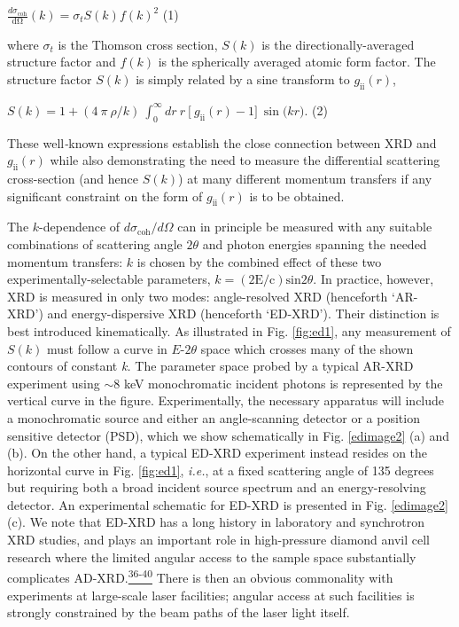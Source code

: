 \(\frac{d\sigma_{\text{coh}}}{\text{dΩ}}\left( k \right) = \sigma_{t}S\left( k \right){f\left( k \right)}^{2}\)
(1)

where \(\sigma_{t}\) is the Thomson cross section, \(S(k)\) is the
directionally-averaged structure factor and \(f\left( k \right)\) is the
spherically averaged atomic form factor. The structure factor \(S(k)\)
is simply related by a sine transform to
\(g_{\text{ii}}\left( r \right)\),

\(S\left( k \right) = 1 + (4\ \pi\ \rho/k)\ \int_{0}^{\infty}{dr\ r\ \lbrack\ g_{\text{ii}}\left( r \right) - 1\rbrack}\ \sin{(kr})\).
(2)

These well\emph{-}known expressions establish the close connection
between XRD and \(g_{\text{ii}}\left( r \right)\) while also
demonstrating the need to measure the differential scattering
cross-section (and hence \(S(k)\)) at many different momentum transfers
if any significant constraint on the form of
\(g_{\text{ii}}\left( r \right)\) is to be obtained.

The \(k\)-dependence of \(d\sigma_{\text{coh}}/d\Omega\) can in
principle be measured with any suitable combinations of scattering angle
\(2\theta\) and photon energies spanning the needed momentum transfers:
\(k\) is chosen by the combined effect of these two
experimentally-selectable parameters,
\(k = \operatorname{(2E/c)sin}{2\theta}\). In practice, however, XRD is
measured in only two modes: angle-resolved XRD (henceforth `AR-XRD') and
energy-dispersive XRD (henceforth `ED-XRD'). Their distinction is best
introduced kinematically. As illustrated in Fig. \ref{fig:ed1}, any measurement of
\(S(k)\) must follow a curve in \(E\)-\(2\theta\) space which crosses
many of the shown contours of constant \emph{k.} The parameter space
probed by a typical AR-XRD experiment using $\sim 8$ keV
monochromatic incident photons is represented by the vertical curve in
the figure. Experimentally, the necessary apparatus will include a
monochromatic source and either an angle-scanning detector or a position
sensitive detector (PSD), which we show schematically in Fig. \ref{edimage2} (a) and
(b). On the other hand, a typical ED-XRD experiment instead resides on
the horizontal curve in Fig. \ref{fig:ed1}, \emph{i.e.}, at a fixed scattering angle
of 135 degrees but requiring both a broad incident source spectrum and
an energy-resolving detector. An experimental schematic for ED-XRD is
presented in Fig. \ref{edimage2}(c). We note that ED-XRD has a long history in
laboratory and synchrotron XRD studies, and plays an important role in
high-pressure diamond anvil cell research where the limited angular
access to the sample space substantially complicates
AD-XRD.\hyperref[y.-feng-m.-somayazulu-r.-jaramillo-t.-rosenbaum-e.-isaacs-j.-hu-and-h.-k.-mao-review-of-scientific-instruments-76-063913-2005.]{\textsuperscript{36-40}}
There is then an obvious commonality with experiments at large-scale
laser facilities; angular access at such facilities is strongly
constrained by the beam paths of the laser light itself.


